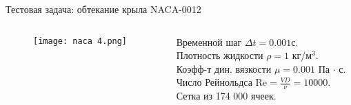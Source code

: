 \documentclass[9pt, ignoreonframetext,unicode]{beamer}
\begin{document}
\begin{frame}{Тестовая задача: обтекание крыла NACA-0012}
	\vspace*{-9mm}
	\begin{columns}
		\begin{column}{0.55\textwidth}
			\begin{figure}[!h]
				\centering
				\texttt{[image: naca 4.png]}
				\label{picnaca}
			\end{figure}
		\end{column}
		\begin{column}{0.5\textwidth}
			Временной шаг $\Delta t = 0.001$с.\\
			Плотность жидкости $\rho = 1$ кг/м$^3$.\\
			Коэфф-т дин. вязкости $\mu = 0.001$ Па $\cdot$ с.\\
			Число Рейнольдса $\text{Re}=\frac{V D}{\nu} =10 000$.\\
				Сетка из 174 000 ячеек.
		\end{column}
	\end{columns}
\vspace*{-5mm}
%
	

\end{frame}
\end{document}
